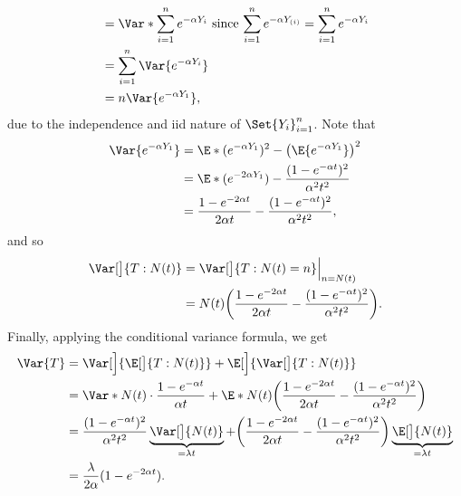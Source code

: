 \begin{Example}
\begin{align*}
             & =\Var*{\sum_{i=1}^{n}e^{-\alpha Y_i}}\text{ since $ \sum_{i=1}^{n}e^{-\alpha Y_{(i)}}=\sum_{i=1}^{n}e^{-\alpha Y_{i}} $} \\
             & =\sum_{i=1}^{n}\Var{e^{-\alpha Y_i}}                                                                                     \\
             & =n\Var{e^{-\alpha Y_1}},
        \end{align*}
        due to the independence and iid nature of $ \Set{Y_i}_{i=1}^n $. Note that
    \begin{align*}
        \Var{e^{-\alpha Y_1}}
         & =\E*{(e^{-\alpha Y_1})^2}-\bigl(\E{e^{-\alpha Y_1}}\bigr)^2                  \\
         & =\E*{(e^{-2\alpha Y_1})}-\frac{(1-e^{-\alpha t})^2}{\alpha^2t^2}             \\
         & =\frac{1-e^{-2\alpha t}}{2\alpha t}-\frac{(1-e^{-\alpha t})^2}{\alpha^2t^2},
    \end{align*}
    and so
    \begin{align*}
        \Var[\big]{T\given N(t)}
         & =\Var[\big]{T\given N(t)=n}\Big\vert_{n=N(t)}                                                  \\
         & =N(t)\biggl(\frac{1-e^{-2\alpha t}}{2\alpha t}-\frac{(1-e^{-\alpha t})^2}{\alpha^2t^2}\biggr).
    \end{align*}
    Finally, applying the conditional variance formula, we get
    \begin{align*}
        \Var{T}
         & =\Var[\Big]{\E[\big]{T\given N(t)}}
        +\E[\Big]{\Var[\big]{T\given N(t)}}                                                                                               \\
         & =\Var*{N(t)\cdot \frac{1-e^{-\alpha t}}{\alpha t}}+
        \E*{N(t)\biggl(\frac{1-e^{-2\alpha t}}{2\alpha t}-\frac{(1-e^{-\alpha t})^2}{\alpha^2t^2}\biggr)}                                 \\
         & =\frac{(1-e^{-\alpha t})^2}{\alpha^2t^2}\underbrace{\Var[\big]{N(t)}}_{=\lambda t}
        +\biggl(\frac{1-e^{-2\alpha t}}{2\alpha t}-\frac{(1-e^{-\alpha t})^2}{\alpha^2t^2}\biggr)\underbrace{\E[\big]{N(t)}}_{=\lambda t} \\
         & =\frac{\lambda}{2\alpha}(1-e^{-2\alpha t}).
    \end{align*}
\end{Example}
